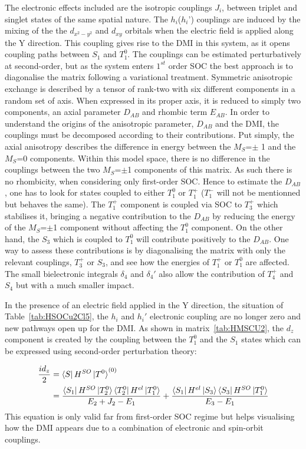 \documentclass[12pt]{report}
\numberwithin{equation}{section}
\begin{document}
The electronic effects included are the isotropic couplings $J_i$, between triplet and singlet states of the same spatial nature. 
The $h_i$($h_i$') couplings are induced by the mixing of the the $d_{x^2-y^2}$ and $d_{xy}$ orbitals when the electric field is applied along the Y direction.
This coupling gives rise to the DMI in this system, as it opens coupling paths between $S_1$ and $T_1^0$.
The couplings can be estimated perturbatively at second-order, but as the system enters $1^{st}$ order SOC the best approach is to diagonalise the matrix following a variational treatment.
Symmetric anisotropic exchange is described by a tensor of rank-two with six different components in a random set of axis.
When expressed in its proper axis, it is reduced to simply two components, an axial parameter $D_{AB}$ and rhombic term $E_{AB}$.
In order to understand the origins of the anisotropic parameter, $D_{AB}$ and the DMI, the couplings must be decomposed according to their contributions.
Put simply, the axial anisotropy describes the difference in energy between the $M_S$=$\pm$ 1 and the $M_S$=0 components.
Within this model space, there is no difference in the couplings between the two $M_S$=$\pm$1 components of this matrix.
As such there is no rhombicity, when considering only first-order SOC.
Hence to estimate the $D_{AB}$, one has to look for states coupled to either $T_1^0$ or $T_1^{+}$ ($T_1^{-}$ will not be mentionned but behaves the same).
The $T_1^{+}$ component is coupled via SOC to $T_3^+$ which stabilises it, bringing a negative contribution to the $D_{AB}$ by reducing the energy of the $M_S$=$\pm$1 component without affecting the $T_1^0$ component.
On the other hand, the $S_3$ which is coupled to $T_1^0$ will contribute positively to the $D_{AB}$. 
One way to assess these contributions is by diagonalising the matrix with only the relevant couplings, $T_3^+$ or $S_3$, and see how the energies of $T_1^+$ or $T_1^0$ are affected.
The small bielectronic integrals $\delta_4$ and $\delta_4'$ also allow the contribution of $T_4^+$ and $S_4$ but with a much smaller impact.

In the presence of an electric field applied in the Y direction, the situation of Table~\ref{tab:HSOCu2Cl5}, the $h_i$ and $h_i'$ electronic coupling are no longer zero and new pathways open up for the DMI.
As shown in matrix~\ref{tab:HMSCU2}, the $d_z$ component is created by the coupling between the $T_1^0$ and the $S_1$ states which can be expressed using second-order perturbation theory:

\begin{align}\label{eq:chemindmi}
    \frac{id_z}{2}&=\bra{S}H^{SO}\ket{T^0}^{(0)}\\
    &=\frac{\bra{S_1}H^{SO}\ket{T_2^0}\bra{T_2^0}H^{el}\ket{T_1^0}}{E_2+J_2-E_1}+\frac{\bra{S_1}H^{el}\ket{S_3}\bra{S_3}H^{SO}\ket{T_1^0}}{E_3-E_1}
\end{align}
This equation is only valid far from first-order SOC regime but helps visualising how the DMI appears due to a combination of electronic and spin-orbit couplings.
\end{document}
